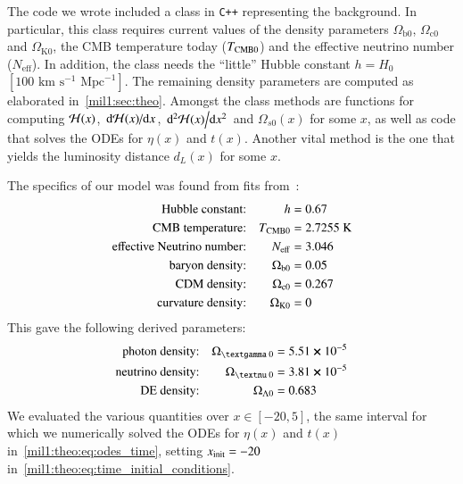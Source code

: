 

The code we wrote included a class in \verb|C++| representing the background. In particular, this class requires current values of the density parameters $\Omega_{\mathrm{b}0}$, $\Omega_{\mathrm{c}0}$ and $\Omega_{\mathrm{K}0}$, the CMB temperature today ($T_{\mathrm{CMB}0}$) and the effective neutrino number ($N_\mathrm{eff}$). In addition, the class needs the ``little'' Hubble constant $h=H_0$~$[100\text{~km}\text{~s}^{-1}\text{~Mpc}^{-1}]$. The remaining density parameters are computed as elaborated in~\cref{mil1:sec:theo}. Amongst the class methods are functions for computing $\mathcal{H}(x)$, $\dv*{\mathcal{H}(x)}{x}$, $\dv*[2]{\mathcal{H}(x)}{x}$ and $\Omega_{s0}(x)$ for some $x$, as well as code that solves the ODEs for $\eta(x)$ and $t(x)$. Another vital method is the one that yields the luminosity distance $d_L(x)$ for some $x$.


The specifics of our model was found from fits from~\citet{Planckdata}:
\begin{equation}\label{mil1:imp:eq:fiducials}
    \begin{split}
        \text{Hubble constant:}&& h &=0.67 \\
        \text{CMB temperature:}&& \TCMB &=2.7255\text{~K} \\
        \text{effective Neutrino number:}&& N\ped{eff}&=3.046\\
        \text{baryon density:}&& \Omega\ped{b 0}&=0.05\\
        \text{CDM density:}&& \Omega\ped{c 0}&=0.267\\
        \text{curvature density:}&& \OmgK&=0
    \end{split}
\end{equation}
This gave the following derived parameters:
\begin{equation}\label{mil1:imp:eq:derived_fiducials}
    \begin{split}
        \text{photon density:}&& \Omega\gped{\textgamma 0}&=5.51 \cross 10^{-5}\\
        \text{neutrino density:}&& \Omega\gped{\textnu 0}&=3.81 \cross 10^{-5}\\
        \text{DE density:}&& \OmgL&=0.683
    \end{split}
\end{equation}
We evaluated the various quantities over $x \in [-20, 5]$, the same interval for which we numerically solved the ODEs for $\eta(x)$ and $t(x)$ in~\cref{mil1:theo:eq:odes_time}, setting $x_\mathrm{init}=-20$ in~\cref{mil1:theo:eq:time_initial_conditions}. 

